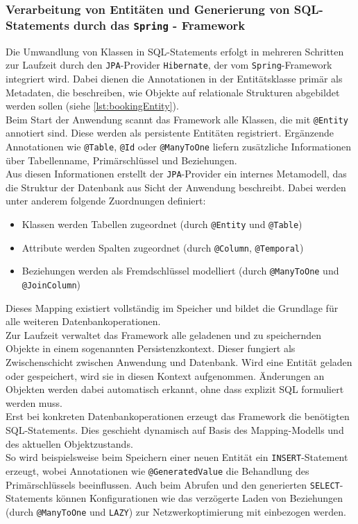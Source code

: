 \subsubsection{Verarbeitung von Entitäten und Generierung von SQL-Statements durch das \texttt{Spring} - Framework}
Die Umwandlung von Klassen in SQL-Statements erfolgt in mehreren Schritten zur Laufzeit durch den \texttt{JPA}-Provider \texttt{Hibernate}, der vom \texttt{Spring}-Framework integriert wird.
Dabei dienen die Annotationen in der Entitätsklasse primär als Metadaten, die beschreiben, wie Objekte auf relationale Strukturen abgebildet werden sollen (siehe \ref{lst:bookingEntity}).
\\
Beim Start der Anwendung scannt das Framework alle Klassen, die mit \texttt{@Entity} annotiert sind. 
Diese werden als persistente Entitäten registriert. 
Ergänzende Annotationen wie \texttt{@Table}, \texttt{@Id} oder \texttt{@ManyToOne} liefern zusätzliche Informationen über Tabellenname, Primärschlüssel und Beziehungen.
\\
Aus diesen Informationen erstellt der \texttt{JPA}-Provider ein internes Metamodell, das die Struktur der Datenbank aus Sicht der Anwendung beschreibt.
Dabei werden unter anderem folgende Zuordnungen definiert:

\begin{itemize}
\item Klassen werden Tabellen zugeordnet (durch \texttt{@Entity} und \texttt{@Table})
\item Attribute werden Spalten zugeordnet (durch \texttt{@Column}, \texttt{@Temporal})
\item Beziehungen werden als Fremdschlüssel modelliert (durch \texttt{@ManyToOne} und \texttt{@JoinColumn})
\end{itemize}

Dieses Mapping existiert vollständig im Speicher und bildet die Grundlage für alle weiteren Datenbankoperationen.
\\
Zur Laufzeit verwaltet das Framework alle geladenen und zu speichernden Objekte in einem sogenannten Persistenzkontext. 
Dieser fungiert als Zwischenschicht zwischen Anwendung und Datenbank.
Wird eine Entität geladen oder gespeichert, wird sie in diesen Kontext aufgenommen. 
Änderungen an Objekten werden dabei automatisch erkannt, ohne dass explizit SQL formuliert werden muss.
\\
Erst bei konkreten Datenbankoperationen erzeugt das Framework die benötigten SQL-Statements. 
Dies geschieht dynamisch auf Basis des Mapping-Modells und des aktuellen Objektzustands.
\\So wird beispielsweise beim Speichern einer neuen Entität ein \texttt{INSERT}-Statement erzeugt, wobei Annotationen wie \texttt{@GeneratedValue} die Behandlung des Primärschlüssels beeinflussen.
Auch beim Abrufen und den generierten \texttt{SELECT}-Statements können Konfigurationen wie das verzögerte Laden von Beziehungen (durch \texttt{@ManyToOne} und \texttt{LAZY}) zur Netzwerkoptimierung mit einbezogen werden.

